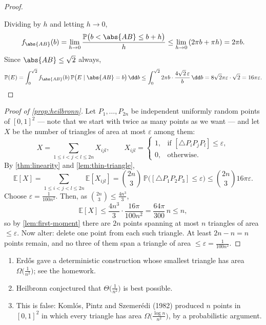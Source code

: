 \begin{proof}
\begin{center}
    \end{center}
    Dividing by \(h\) and letting \(h \to 0\),
    \[
        f_{\abs{AB}}(b) = \lim_{h \to 0} \frac{\mathbb{P}\bigl( b < \abs{AB} \le b+h \bigr)}{h} \le \lim_{h \to 0} \, (2\pi b + \pi h) = 2\pi b.
    \]
    Since \(\abs{AB} \le \sqrt{2}\) always,
    \[
        \mathbb{P}(E) = \int_{0}^{\sqrt{2}} f_{\abs{AB}}(b) \, \mathbb{P}\bigl( E \mid \abs{AB} = b \bigr) \, \dd b
        \le \int_{0}^{\sqrt{2}} 2\pi b \cdot \frac{4\sqrt{2}\, \varepsilon}{b} \, \dd b
        = 8\sqrt{2} \pi \varepsilon \cdot \sqrt{2} = 16 \pi \varepsilon. \qedhere
    \]
\end{proof}

\begin{proof}[Proof of \autoref{prop:heilbronn}]
    Let \(P_1, \ldots, P_{2n}\) be independent uniformly random points of \([0,1]^2\) --- note that we start with twice as many points as we want --- and let \(X\) be the number of triangles of area at most \(\varepsilon\) among them:
    \[
        X = \sum_{1 \le i < j < l \le 2n} X_{ijl}, \qquad
        X_{ijl} = \begin{cases} 1, & \text{if } [\triangle P_i P_j P_l] \le \varepsilon, \\ 0, & \text{otherwise}. \end{cases}
    \]
    By \autoref{thm:linearity} and \autoref{lem:thin-triangle},
    \[
        \mathbb{E}[X] = \sum_{1 \le i < j < l \le 2n} \mathbb{E}[X_{ijl}] = \binom{2n}{3} \, \mathbb{P}\bigl( [\triangle P_1 P_2 P_3] \le \varepsilon \bigr) \le \binom{2n}{3} 16 \pi \varepsilon.
    \]
    Choose \(\varepsilon = \frac{1}{100 n^2}\). Then, as \(\binom{2n}{3} \le \frac{4n^3}{3}\),
    \[
        \mathbb{E}[X] \le \frac{4 n^3}{3} \cdot \frac{16 \pi}{100 n^2} = \frac{64 \pi}{300} \, n \le n,
    \]
    so by \autoref{lem:first-moment} there are \(2n\) points spanning at most \(n\) triangles of area \(\le \varepsilon\). Now alter: delete one point from each such triangle. At least \(2n - n = n\) points remain, and no three of them span a triangle of area \(\le \varepsilon = \frac{1}{100n^2}\).
\end{proof}

\begin{remark}\hfill
    \begin{enumerate}[(1)]
        \item Erd\H{o}s gave a deterministic construction whose smallest triangle has area \(\Omega\bigl( \frac{1}{n^2} \bigr)\); see the homework.
        \item Heilbronn conjectured that \(\Theta\bigl( \frac{1}{n^2} \bigr)\) is best possible.
        \item This is false: Koml\'os, Pintz and Szemer\'edi (1982) produced \(n\) points in \([0,1]^2\) in which every triangle has area \(\Omega\bigl( \frac{\log n}{n^2} \bigr)\), by a probabilistic argument.
    \end{enumerate}
\end{remark}

